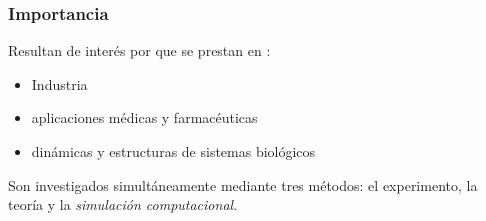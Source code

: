   \begin{frame}
    \frametitle{Importancia}
    Resultan de inter\'es por que se prestan  en :
    \begin{itemize}
      \item Industria
      \item aplicaciones m\'edicas y farmac\'euticas
      \item din\'amicas y estructuras de sistemas biol\'ogicos
    \end{itemize}
    \begin{exampleblock}{Son investigados simult\'aneamente mediante tres m\'etodos:}
       el experimento, la teor\'ia y la \emph {simulaci\'on computacional}.
    \end{exampleblock}
  \end{frame}
